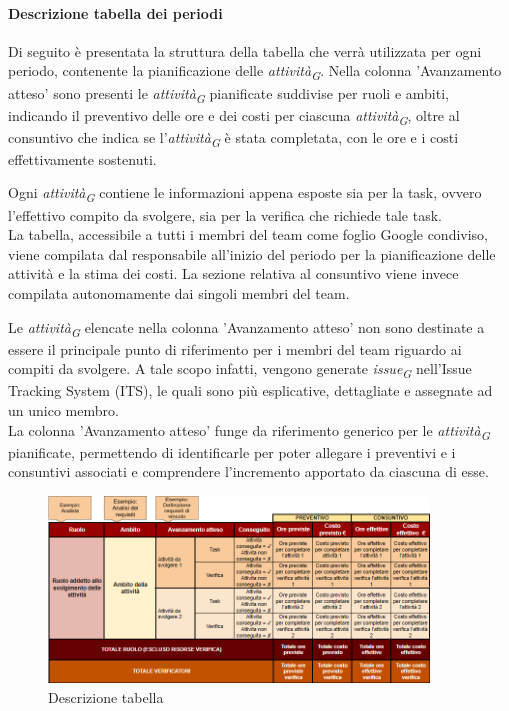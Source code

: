 \paragraph{Descrizione tabella dei periodi}\label{sec:DescrTabella}

Di seguito è presentata la struttura della tabella che verrà utilizzata per ogni periodo, contenente la pianificazione delle \textit{attività}\textsubscript{\textit{G}}. Nella colonna 'Avanzamento atteso' sono presenti le \textit{attività}\textsubscript{\textit{G}} pianificate suddivise per ruoli e ambiti, indicando il preventivo delle ore e dei costi per ciascuna \textit{attività}\textsubscript{\textit{G}}, oltre al consuntivo che indica se l'\textit{attività}\textsubscript{\textit{G}} è stata completata, con le ore e i costi effettivamente sostenuti.

Ogni \textit{attività}\textsubscript{\textit{G}} contiene le informazioni appena esposte sia per la task, ovvero l'effettivo compito da svolgere,  sia per la verifica che richiede tale task. \\
La tabella, accessibile a tutti i membri del team come foglio Google condiviso, viene compilata dal responsabile all'inizio del periodo per la pianificazione delle attività e la stima dei costi. La sezione relativa al consuntivo viene invece compilata autonomamente dai singoli membri del team.

Le \textit{attività}\textsubscript{\textit{G}} elencate nella colonna 'Avanzamento atteso' non sono destinate a essere il principale punto di riferimento per i membri del team riguardo ai compiti da svolgere. A tale scopo infatti, vengono generate \textit{issue}\textsubscript{\textit{G}} nell'Issue Tracking System (ITS), le quali sono più esplicative, dettagliate e assegnate ad un unico membro. \\
La colonna 'Avanzamento atteso' funge da riferimento generico per le \textit{attività}\textsubscript{\textit{G}} pianificate, permettendo di identificarle per poter allegare i preventivi e i consuntivi associati e comprendere l'incremento apportato da ciascuna di esse.

\vspace{0.5cm}

\begin{figure}[H]
    \centering
    \includegraphics[width=0.9\textwidth]{../Images/spiegazioneTabella.png}
    \caption{Descrizione tabella} 
    \label{fig:spiegazioneTabella} 
\end{figure}